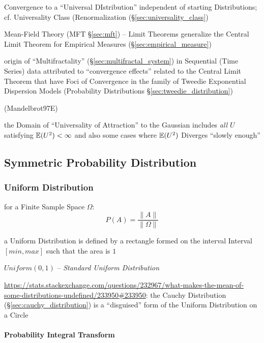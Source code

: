 \fist Convergence to a ``Universal DIstribution'' independent of starting
Distributions; cf. Universality Class (Renormalization
(\S\ref{sec:universality_class})

\fist Mean-Field Theory (MFT \S\ref{sec:mft}) -- Limit Theorems generalize the
Central Limit Theorem for Empirical Measures (\S\ref{sec:empirical_measure})

\fist origin of ``Multifractality'' (\S\ref{sec:multifractal_system}) in
Sequential (Time Series) data attributed to ``convergence effects'' related to
the Central Limit Theorem that have Foci of Convergence in the family of Tweedie
Exponential Dispersion Models (Probability Distributions
\S\ref{sec:tweedie_distribution})

(Mandelbrot97E)

the Domain of ``Universality of Attraction'' to the Gaussian includes \emph{all}
$U$ satisfying $\mathbb{E}(U^2) < \infty$ and also some cases where $\mathbb{E}(U^2)$
Diverges ``slowly enough''



\subsection{Symmetric Probability Distribution}
\label{sec:symmetric_probability}

\subsubsection{Uniform Distribution}\label{sec:uniform_distribution}

for a Finite Sample Space $\Omega$:
\[
  P(A) = \frac{\|A\|}{\|\Omega\|}
\]

a Uniform Distribution is defined by a rectangle formed on the interval Interval
$[min,max]$ such that the area is $1$

$Uniform(0,1)$ -- \emph{Standard Uniform Distribution}

\url{https://stats.stackexchange.com/questions/232967/what-makes-the-mean-of-some-distributions-undefined/233950#233950}:
the Cauchy Distribution (\S\ref{sec:cauchy_distribution}) is a ``disguised''
form of the Uniform Distribution on a Circle



\paragraph{Probability Integral Transform}
\label{sec:probability_integral_transform}\hfill

